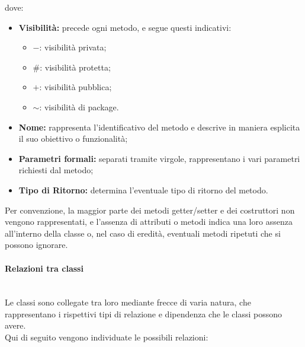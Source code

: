 \documentclass[8pt]{article}
\newcommand{\subsubsubsection}[1]{\paragraph{#1}\mbox{}\\}
\begin{document}
\begin{enumerate}
          dove:\\
          \begin{itemize}
            \item \textbf{Visibilità:} precede ogni metodo, e segue questi indicativi:
                \begin{itemize}
                    \item $-$: visibilità privata;
                    \item $\#$: visibilità protetta;
                    \item $+$: visibilità pubblica;
                    \item $\sim$: visibilità di package. 
                \end{itemize}
            \item \textbf{Nome:} rappresenta l'identificativo del metodo e descrive in maniera esplicita il suo obiettivo o funzionalità;
            \item \textbf{Parametri formali:} separati tramite virgole, rappresentano i vari parametri richiesti dal metodo;
            \item \textbf{Tipo di Ritorno:} determina l'eventuale tipo di ritorno del metodo.
            \end{itemize}
    \end{enumerate}
        Per convenzione, la maggior parte dei metodi getter/setter e dei costruttori non vengono rappresentati, e l'assenza di attributi o metodi indica una loro assenza all'interno della classe o, nel caso di eredità, eventuali metodi ripetuti che si possono ignorare.  
 \subsubsubsection{Relazioni tra classi}
 Le classi sono collegate tra loro mediante frecce di varia natura, che rappresentano i rispettivi tipi di relazione e dipendenza che le classi possono avere.\\
 Qui di seguito vengono individuate le possibili relazioni:
         \clearpage
\end{document}
